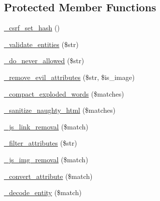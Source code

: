 \subsection*{Protected Member Functions}
\begin{DoxyCompactItemize}
\item 
\hyperlink{class_c_i___security_a7064dd5501c1dfab05ba6ac8838beb01}{\+\_\+csrf\+\_\+set\+\_\+hash} ()
\item 
\hyperlink{class_c_i___security_a31b2c9ae75f39b9b38fe05c494bb0f79}{\+\_\+validate\+\_\+entities} (\$str)
\item 
\hyperlink{class_c_i___security_a61217e43f888cdf8afb1fba16b5cd9f6}{\+\_\+do\+\_\+never\+\_\+allowed} (\$str)
\item 
\hyperlink{class_c_i___security_a37c160ddffea957e9eb03dbfd3471a78}{\+\_\+remove\+\_\+evil\+\_\+attributes} (\$str, \$is\+\_\+image)
\item 
\hyperlink{class_c_i___security_adfb0e251ae35ae40303a302d253c3ab2}{\+\_\+compact\+\_\+exploded\+\_\+words} (\$matches)
\item 
\hyperlink{class_c_i___security_af67689597607833df370031fb799c92b}{\+\_\+sanitize\+\_\+naughty\+\_\+html} (\$matches)
\item 
\hyperlink{class_c_i___security_a6b1744acaf85e05c65ab17242dea4f06}{\+\_\+js\+\_\+link\+\_\+removal} (\$match)
\item 
\hyperlink{class_c_i___security_aa385a9c7527f5eece656b9cac73979d3}{\+\_\+filter\+\_\+attributes} (\$str)
\item 
\hyperlink{class_c_i___security_a5c5e91dc8e3df0174e4e074dd375a8db}{\+\_\+js\+\_\+img\+\_\+removal} (\$match)
\item 
\hyperlink{class_c_i___security_ae16451bcdc769285c499cbf8068b3523}{\+\_\+convert\+\_\+attribute} (\$match)
\item 
\hyperlink{class_c_i___security_a5289832cb3ae9cee3c12e82ede958874}{\+\_\+decode\+\_\+entity} (\$match)
\end{DoxyCompactItemize}

